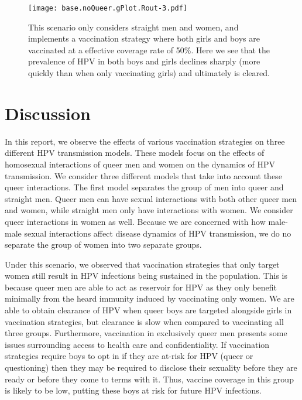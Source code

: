 \documentclass[12pt]{article}
\begin{document}
\begin{figure}[h!]
\begin{center}
\texttt{[image: base.noQueer.gPlot.Rout-3.pdf]}
\caption{This scenario only considers straight men and women, and implements a vaccination strategy where both girls and boys are vaccinated at a effective coverage rate of 50\%.  Here we see that the prevalence of HPV in both boys and girls declines sharply (more quickly than when only vaccinating girls) and ultimately is cleared.}
\label{fig:noQueerAllVacc50}
\end{center}
\end{figure}





\section{Discussion}

In this report, we observe the effects of various vaccination strategies on three different HPV transmission models.  These models focus on the effects of homosexual interactions of queer men and women on the dynamics of HPV transmission.  We consider three different models that take into account these queer interactions.  The first model separates the group of men into queer and straight men.  Queer men can have sexual interactions with both other queer men and women, while straight men only have interactions with women.  We consider queer interactions in women as well.  Because we are concerned with how male-male sexual interactions affect disease dynamics of HPV transmission, we do no separate the group of women into two separate groups.  

Under this scenario, we observed that vaccination strategies that only target women still result in HPV infections being sustained in the population.  This is because queer men are able to act as reservoir for HPV as they only benefit minimally from the heard immunity induced by vaccinating only women.  We are able to obtain clearance of HPV when queer boys are targeted alongside girls in vaccination strategies, but clearance is slow when compared to vaccinating all three groups.  Furthermore, vaccination in exclusively queer men presents some issues surrounding access to health care and confidentiality.  If vaccination strategies require boys to opt in if they are at-risk for HPV (queer or questioning) then they may be required to disclose their sexuality before they are ready or before they come to terms with it.  Thus, vaccine coverage in this group is likely to be low, putting these boys at risk for future HPV infections.  
\end{document}
